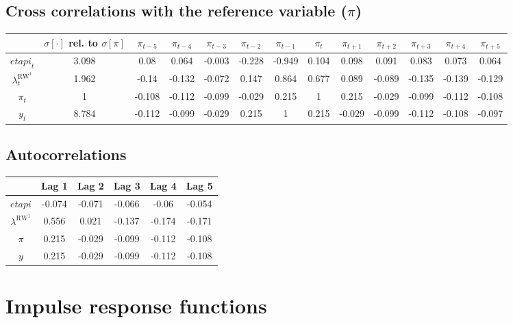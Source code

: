 \subsection{Cross correlations with the reference variable ($\pi$)}

\begin{tabular}{c|c|c|c|c|c|c|c|c|c|c|c|c|}
  & $\sigma[\cdot]$ rel. to $\sigma[\pi]$ & $\pi_{t-5}$ & $\pi_{t-4}$ & $\pi_{t-3}$ & $\pi_{t-2}$ & $\pi_{t-1}$ & $\pi_{t}$ & $\pi_{t+1}$ & $\pi_{t+2}$ & $\pi_{t+3}$ & $\pi_{t+4}$ & $\pi_{t+5}$\\
\hline
${e\!t\!a\!p\!i}_{t}$ & 3.098 & 0.08 & 0.064 & -0.003 & -0.228 & -0.949 & 0.104 & 0.098 & 0.091 & 0.083 & 0.073 & 0.064 \\
$\lambda^{\mathrm{RW}^{\mathrm{1}}}_{t}$ & 1.962 & -0.14 & -0.132 & -0.072 & 0.147 & 0.864 & 0.677 & 0.089 & -0.089 & -0.135 & -0.139 & -0.129 \\
$\pi_{t}$ & 1 & -0.108 & -0.112 & -0.099 & -0.029 & 0.215 & 1 & 0.215 & -0.029 & -0.099 & -0.112 & -0.108 \\
$y_{t}$ & 8.784 & -0.112 & -0.099 & -0.029 & 0.215 & 1 & 0.215 & -0.029 & -0.099 & -0.112 & -0.108 & -0.097 \\
\hline
\end{tabular}


\subsection{Autocorrelations}

\begin{tabular}{c|ccccc|}
  & Lag 1 & Lag 2 & Lag 3 & Lag 4 & Lag 5\\
\hline
${e\!t\!a\!p\!i}$ & -0.074 & -0.071 & -0.066 & -0.06 & -0.054 \\
$\lambda^{\mathrm{RW}^{\mathrm{1}}}$ & 0.556 & 0.021 & -0.137 & -0.174 & -0.171 \\
$\pi$ & 0.215 & -0.029 & -0.099 & -0.112 & -0.108 \\
$y$ & 0.215 & -0.029 & -0.099 & -0.112 & -0.108 \\
\hline
\end{tabular}



\pagebreak

\section{Impulse response functions}

